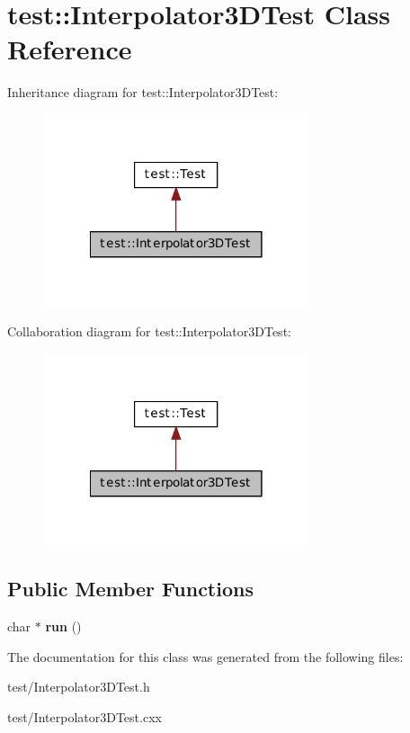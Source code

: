 \hypertarget{classtest_1_1_interpolator3_d_test}{
\section{test::Interpolator3DTest Class Reference}
\label{classtest_1_1_interpolator3_d_test}
}


Inheritance diagram for test::Interpolator3DTest:\nopagebreak
\begin{figure}[H]
\begin{center}
\leavevmode
\includegraphics[width=222pt]{classtest_1_1_interpolator3_d_test__inherit__graph}
\end{center}
\end{figure}


Collaboration diagram for test::Interpolator3DTest:\nopagebreak
\begin{figure}[H]
\begin{center}
\leavevmode
\includegraphics[width=222pt]{classtest_1_1_interpolator3_d_test__coll__graph}
\end{center}
\end{figure}
\subsection*{Public Member Functions}
\begin{DoxyCompactItemize}
\item 
\hypertarget{classtest_1_1_interpolator3_d_test_a3e82a9e9ba5976ea31e5f204bea3700d}{
char $\ast$ {\bfseries run} ()}
\label{classtest_1_1_interpolator3_d_test_a3e82a9e9ba5976ea31e5f204bea3700d}

\end{DoxyCompactItemize}


The documentation for this class was generated from the following files:\begin{DoxyCompactItemize}
\item 
test/Interpolator3DTest.h\item 
test/Interpolator3DTest.cxx\end{DoxyCompactItemize}
